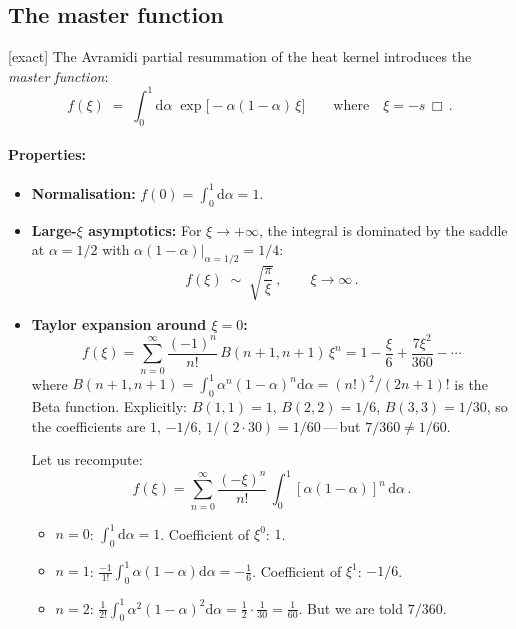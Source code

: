 \documentclass[12pt,a4paper]{article}
\theoremstyle{definition}
\theoremstyle{remark}
\newcommand{\dd}{\mathrm{d}}
\newcommand{\exact}{\textcolor{blue!70!black}{\textsf{[exact]}}}
\begin{document}
\subsection{The master function}

\exact\;
The Avramidi partial resummation of the heat kernel introduces the
\emph{master function}:
\begin{equation}
  \boxed{
  f(\xi)
  \;=\;
  \int_0^1 \dd\alpha\;
  \exp\!\bigl[-\alpha(1-\alpha)\,\xi\bigr]
  }
  \qquad \text{where}\quad
  \xi = -s\,\Box\,.
  \label{eq:master-f}
\end{equation}

\paragraph{Properties:}
\begin{itemize}
\item \textbf{Normalisation:}
  $f(0) = \int_0^1\dd\alpha = 1$. \checkmark

\item \textbf{Large-$\xi$ asymptotics:}
  For $\xi\to+\infty$, the integral is dominated by the saddle at
  $\alpha=1/2$ with $\alpha(1-\alpha)|_{\alpha=1/2}=1/4$:
  \begin{equation}
    f(\xi) \;\sim\; \sqrt{\frac{\pi}{\xi}}\,,
    \qquad \xi\to\infty\,.
    \label{eq:f-large-xi}
  \end{equation}

\item \textbf{Taylor expansion around $\xi=0$:}
  \begin{equation}
    f(\xi) = \sum_{n=0}^{\infty}
    \frac{(-1)^n}{n!}\,B(n+1,n+1)\,\xi^n
    = 1 - \frac{\xi}{6} + \frac{7\xi^2}{360} - \cdots
    \label{eq:f-taylor}
  \end{equation}
  where $B(n{+}1,n{+}1)=\int_0^1\alpha^n(1-\alpha)^n\dd\alpha
  =(n!)^2/(2n+1)!$ is the Beta function.
  Explicitly: $B(1,1)=1$, $B(2,2)=1/6$, $B(3,3)=1/30$, so the
  coefficients are $1$, $-1/6$, $1/(2\cdot30)=1/60$\,---\,but
  $7/360\ne 1/60$.

  Let us recompute:
  \[
    f(\xi) = \sum_{n=0}^\infty \frac{(-\xi)^n}{n!}\,
    \int_0^1[\alpha(1-\alpha)]^n\,\dd\alpha\,.
  \]
  \begin{itemize}
  \item $n=0$: $\int_0^1\dd\alpha=1$. Coefficient of $\xi^0$: $1$.
  \item $n=1$: $\frac{-1}{1!}\int_0^1\alpha(1-\alpha)\dd\alpha
    = -\frac{1}{6}$. Coefficient of $\xi^1$: $-1/6$.
  \item $n=2$: $\frac{1}{2!}\int_0^1\alpha^2(1-\alpha)^2\dd\alpha
    = \frac{1}{2}\cdot\frac{1}{30}
    = \frac{1}{60}$. But we are told $7/360$.


\end{itemize}
\end{itemize}
\end{document}
